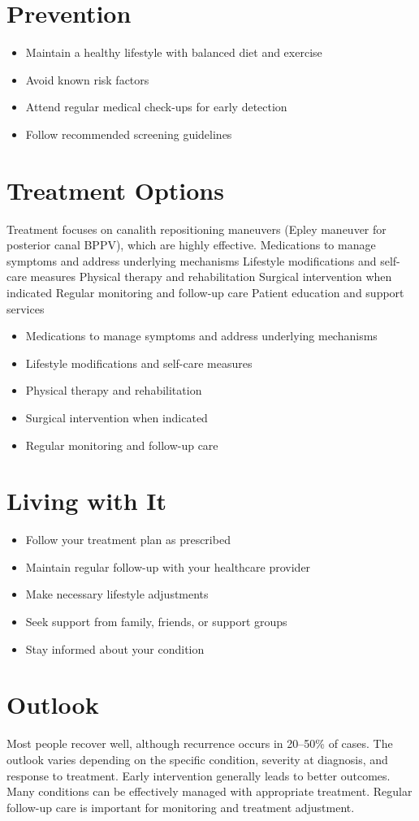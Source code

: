 \section{Prevention}
\begin{itemize}[noitemsep]
  \item Maintain a healthy lifestyle with balanced diet and exercise
  \item Avoid known risk factors
  \item Attend regular medical check-ups for early detection
  \item Follow recommended screening guidelines
\end{itemize}
\section{Treatment Options}
Treatment focuses on canalith repositioning maneuvers (Epley maneuver for posterior canal BPPV), which are highly effective. Medications to manage symptoms and address underlying mechanisms Lifestyle modifications and self-care measures Physical therapy and rehabilitation Surgical intervention when indicated Regular monitoring and follow-up care Patient education and support services

\begin{itemize}[noitemsep]
  \item Medications to manage symptoms and address underlying mechanisms
  \item Lifestyle modifications and self-care measures
  \item Physical therapy and rehabilitation
  \item Surgical intervention when indicated
  \item Regular monitoring and follow-up care
\end{itemize}
\section{Living with It}
\begin{itemize}[noitemsep]
  \item Follow your treatment plan as prescribed
  \item Maintain regular follow-up with your healthcare provider
  \item Make necessary lifestyle adjustments
  \item Seek support from family, friends, or support groups
  \item Stay informed about your condition
\end{itemize}
\section{Outlook}
Most people recover well, although recurrence occurs in 20--50\% of cases. The outlook varies depending on the specific condition, severity at diagnosis, and response to treatment. Early intervention generally leads to better outcomes. Many conditions can be effectively managed with appropriate treatment. Regular follow-up care is important for monitoring and treatment adjustment.
